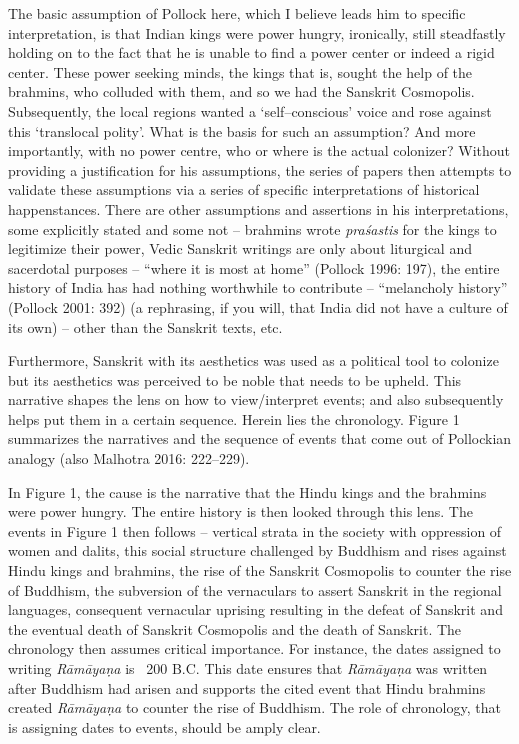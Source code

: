 The basic assumption of Pollock here, which I believe leads him to specific interpretation, is that Indian kings were power hungry, ironically, still steadfastly holding on to the fact that he is unable to find a power center or indeed a rigid center. These power seeking minds, the kings that is, sought the help of the brahmins, who colluded with them, and so we had the Sanskrit Cosmopolis. Subsequently, the local regions wanted a ‘self–conscious’ voice and rose against this ‘translocal polity’. What is the basis for such an assumption? And more importantly, with no power centre, who or where is the actual colonizer? Without providing a justification for his assumptions, the series of papers then attempts to validate these assumptions via a series of specific interpretations of historical happenstances. There are other assumptions and assertions in his interpretations, some explicitly stated and some not – brahmins wrote \textit{praśastis} for the kings to legitimize their power, Vedic Sanskrit writings are only about liturgical and sacerdotal purposes – “where it is most at home” (Pollock 1996: 197), the entire history of India has had nothing worthwhile to contribute – “melancholy history” (Pollock 2001: 392) (a rephrasing, if you will, that India did not have a culture of its own) – other than the Sanskrit texts, etc.

Furthermore, Sanskrit with its aesthetics was used as a political tool to colonize but its aesthetics was perceived to be noble that needs to be upheld. This narrative shapes the lens on how to view/interpret events; and also subsequently helps put them in a certain sequence. Herein lies the chronology. Figure 1 summarizes the narratives and the sequence of events that come out of Pollockian analogy (also Malhotra 2016: 222–229).

In Figure 1, the cause is the narrative that the Hindu kings and the brahmins were power hungry. The entire history is then looked through this lens. The events in Figure 1 then follows – vertical strata in the society with oppression of women and dalits, this social structure challenged by Buddhism and rises against Hindu kings and brahmins, the rise of the Sanskrit Cosmopolis to counter the rise of Buddhism, the subversion of the vernaculars to assert Sanskrit in the regional languages, consequent vernacular uprising resulting in the defeat of Sanskrit and the eventual death of Sanskrit Cosmopolis and the death of Sanskrit. The chronology then assumes critical importance. For instance, the dates assigned to writing \textit{Rāmāyaṇa} is ~200 B.C. This date ensures that \textit{Rāmāyaṇa} was written after Buddhism had arisen and supports the cited event that Hindu brahmins created \textit{Rāmāyaṇa} to counter the rise of Buddhism. The role of chronology, that is assigning dates to events, should be amply clear.

